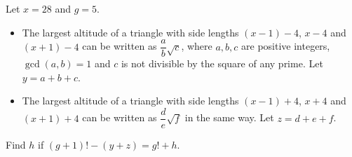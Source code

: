 Let $x=28$ and $g=5$.
\begin{itemize}
\item The largest altitude of a triangle with side lengths $(x-1)-4$, $x-4$ and $(x+1)-4$ can be written as $\dfrac {a}{b}\sqrt c$, where $a,b,c$ are positive integers, $\gcd(a,b)=1$ and $c$ is not divisible by the square of any prime. Let $y=a+b+c$.
\item The largest altitude of a triangle with side lengths $(x-1)+4$, $x+4$ and $(x+1)+4$ can be written as $\dfrac {d}{e}\sqrt f$ in the same way. Let $z=d+e+f$.
\end{itemize}
Find $h$ if $(g+1)!-(y+z)=g!+h$.
